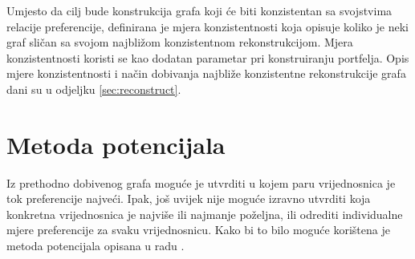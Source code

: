 \documentclass[lmodern, utf8, diplomski, numeric]{fer}
\newcommand{\graph}[1]{\mathcal{#1}}
\begin{document}
  Umjesto da cilj bude konstrukcija grafa koji će biti konzistentan sa svojstvima relacije preferencije, definirana je mjera konzistentnosti koja opisuje koliko je neki graf sličan sa svojom najbližom konzistentnom rekonstrukcijom.
  Mjera konzistentnosti koristi se kao dodatan parametar pri konstruiranju portfelja.
  Opis mjere konzistentnosti i način dobivanja najbliže konzistentne rekonstrukcije grafa dani su u odjeljku \ref{sec:reconstruct}.
  
  
  

  \section{Metoda potencijala}
  \label{sec:metpot}
  Iz prethodno dobivenog grafa moguće je utvrditi u kojem paru vrijednosnica je tok preferencije najveći.
  Ipak, još uvijek nije moguće izravno utvrditi koja konkretna vrijednosnica je najviše ili najmanje poželjna, ili odrediti individualne mjere preferencije za svaku vrijednosnicu.
  Kako bi to bilo moguće korištena je metoda potencijala opisana u radu \citep{potential}.
  
  
\end{document}
